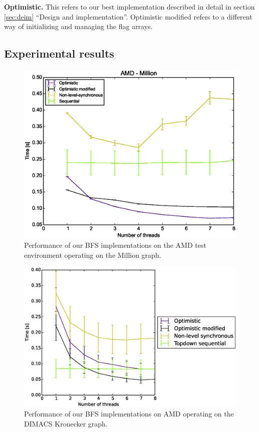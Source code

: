 \documentclass[letterpaper]{article}
\newcommand{\mypar}[1]{{\bf #1.}} %
\begin{document}
		\mypar{Optimistic}
		This refers to our best implementation described in detail in section \ref{sec:deim} ``Design and implementation''.
		Optimistic modified refers to a different way of initializing and managing the flag arrays.



	\subsection{Experimental results}

		\begin{figure}[t]
			\centering
	  		\includegraphics[scale=0.33]{amd_million.eps}
	  		\vspace*{-0.3cm}
	  		\caption{Performance of our BFS implementations on the AMD test environment operating on the Million graph.\label{fig:amdbig}}
		\end{figure}
		
		\begin{figure}[t]
			\centering
	  		\includegraphics[scale=0.33]{amd_dimacskron.eps}
	  		\vspace*{-0.3cm}
	  		\caption{Performance of our BFS implementations on AMD operating on the DIMACS Kronecker graph.\label{fig:amdkron}}
		\end{figure}
\end{document}
